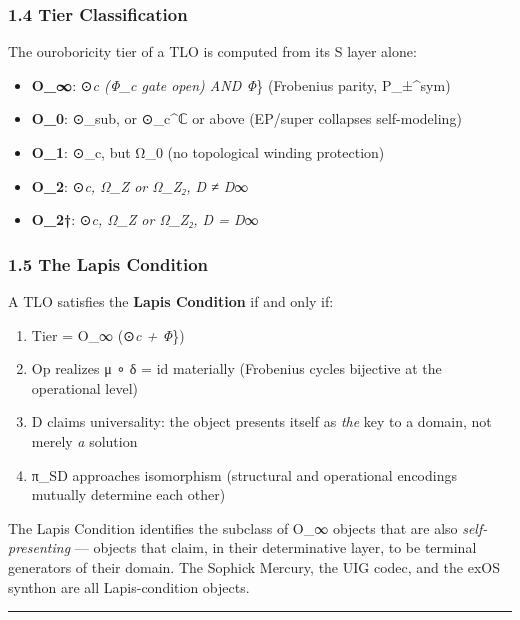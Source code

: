 \documentclass[
  11pt,
  a4paper,
]{article}
\providecommand{\tightlist}{%
  \setlength{\itemsep}{0pt}\setlength{\parskip}{0pt}}
\begin{document}
\subsubsection{1.4 Tier Classification}\label{tier-classification}

The ouroboricity tier of a TLO is computed from its S layer alone:

\begin{itemize}
\tightlist
\item
  \textbf{O\_∞}: ⊙\emph{c (Φ\_c gate open) AND Φ}\} (Frobenius parity,
  P\_±\^{}sym)
\item
  \textbf{O\_0}: ⊙\_sub, or ⊙\_c\^{}ℂ or above (EP/super collapses
  self-modeling)
\item
  \textbf{O\_1}: ⊙\_c, but Ω\_0 (no topological winding protection)
\item
  \textbf{O\_2}: ⊙\emph{c, Ω\_Z or Ω\_Z₂, D ≠ D}∞
\item
  \textbf{O\_2†}: ⊙\emph{c, Ω\_Z or Ω\_Z₂, D = D}∞
\end{itemize}

\subsubsection{1.5 The Lapis Condition}\label{the-lapis-condition}

A TLO satisfies the \textbf{Lapis Condition} if and only if:

\begin{enumerate}
\def\labelenumi{\arabic{enumi}.}
\tightlist
\item
  Tier = O\_∞ (⊙\emph{c + Φ}\})
\item
  Op realizes μ ∘ δ = id materially (Frobenius cycles bijective at the
  operational level)
\item
  D claims universality: the object presents itself as \emph{the} key to
  a domain, not merely \emph{a} solution
\item
  π\_SD approaches isomorphism (structural and operational encodings
  mutually determine each other)
\end{enumerate}

The Lapis Condition identifies the subclass of O\_∞ objects that are
also \emph{self-presenting} --- objects that claim, in their
determinative layer, to be terminal generators of their domain. The
Sophick Mercury, the UIG codec, and the exOS synthon are all
Lapis-condition objects.

\begin{center}\rule{0.5\linewidth}{0.5pt}\end{center}
\end{document}
